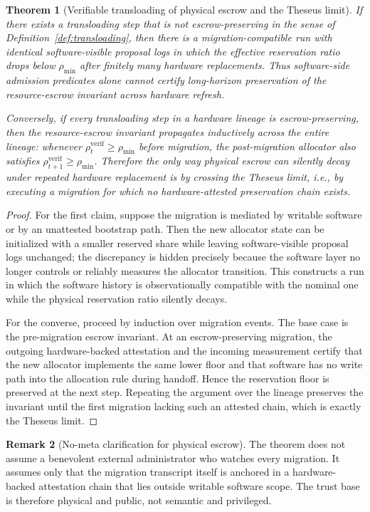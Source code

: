 \documentclass[11pt]{article}
\newtheorem{theorem}{Theorem}[section]
\theoremstyle{definition}
\newtheorem{remark}[theorem]{Remark}
\newcommand{\1}{\mathbf{1}}
\begin{document}
\begin{theorem}[Verifiable transloading of physical escrow and the Theseus limit]\label{thm:theseus_limit}
If there exists a transloading step that is not escrow-preserving in the sense of Definition~\ref{def:transloading}, then there is a migration-compatible run with identical software-visible proposal logs in which the effective reservation ratio drops below $\rho_{\min}$ after finitely many hardware replacements. Thus software-side admission predicates alone cannot certify long-horizon preservation of the resource-escrow invariant across hardware refresh.

Conversely, if every transloading step in a hardware lineage is escrow-preserving, then the resource-escrow invariant propagates inductively across the entire lineage: whenever $\rho_t^{\mathrm{verif}}\ge \rho_{\min}$ before migration, the post-migration allocator also satisfies $\rho_{t+1}^{\mathrm{verif}}\ge \rho_{\min}$. Therefore the only way physical escrow can silently decay under repeated hardware replacement is by crossing the Theseus limit, i.e., by executing a migration for which no hardware-attested preservation chain exists.
\end{theorem}

\begin{proof}
For the first claim, suppose the migration is mediated by writable software or by an unattested bootstrap path. Then the new allocator state can be initialized with a smaller reserved share while leaving software-visible proposal logs unchanged; the discrepancy is hidden precisely because the software layer no longer controls or reliably measures the allocator transition. This constructs a run in which the software history is observationally compatible with the nominal one while the physical reservation ratio silently decays.

For the converse, proceed by induction over migration events. The base case is the pre-migration escrow invariant. At an escrow-preserving migration, the outgoing hardware-backed attestation and the incoming measurement certify that the new allocator implements the same lower floor and that software has no write path into the allocation rule during handoff. Hence the reservation floor is preserved at the next step. Repeating the argument over the lineage preserves the invariant until the first migration lacking such an attested chain, which is exactly the Theseus limit.
\end{proof}

\begin{remark}[No-meta clarification for physical escrow]
The theorem does not assume a benevolent external administrator who watches every migration. It assumes only that the migration transcript itself is anchored in a hardware-backed attestation chain that lies outside writable software scope. The trust base is therefore physical and public, not semantic and privileged.
\end{remark}
\end{document}
